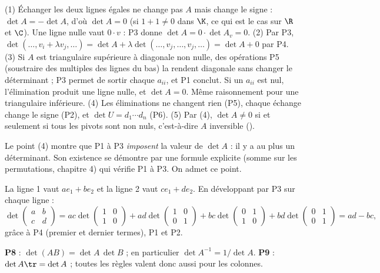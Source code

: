 \begin{preuve}
(1) Échanger les deux lignes égales ne change pas $A$ mais change le signe : $\det A=-\det A$, d'où $\det A=0$ (si $1+1\neq0$ dans $\K$, ce qui est le cas sur $\R$ et $\C$). Une ligne nulle vaut $0\cdot v$ : P3 donne $\det A=0\cdot\det A_v=0$.
(2) Par P3, $\det(\dots,v_i+\lambda v_j,\dots)=\det A+\lambda\det(\dots,v_j,\dots,v_j,\dots)=\det A+0$ par P4.
(3) Si $A$ est triangulaire supérieure à diagonale non nulle, des opérations P5 (soustraire des multiples des lignes du bas) la rendent diagonale sans changer le déterminant ; P3 permet de sortir chaque $a_{ii}$, et P1 conclut. Si un $a_{ii}$ est nul, l'élimination produit une ligne nulle, et $\det A=0$. Même raisonnement pour une triangulaire inférieure.
(4) Les éliminations ne changent rien (P5), chaque échange change le signe (P2), et $\det U=d_1\cdots d_n$ (P6).
(5) Par (4), $\det A\neq0$ si et seulement si tous les pivots sont non nuls, c'est-à-dire $A$ inversible ().
\end{preuve}
\begin{remarque}
Le point (4) montre que P1 à P3 \emph{imposent} la valeur de $\det A$ : il y a au plus un déterminant. Son existence se démontre par une formule explicite (somme sur les permutations, chapitre 4) qui vérifie P1 à P3. On admet ce point.
\end{remarque}
\begin{exemple}
La ligne 1 vaut $ae_1+be_2$ et la ligne 2 vaut $ce_1+de_2$. En développant par P3 sur chaque ligne :
\[\det\begin{pmatrix}a&b\\c&d\end{pmatrix}=ac\det\begin{pmatrix}1&0\\1&0\end{pmatrix}+ad\det\begin{pmatrix}1&0\\0&1\end{pmatrix}+bc\det\begin{pmatrix}0&1\\1&0\end{pmatrix}+bd\det\begin{pmatrix}0&1\\0&1\end{pmatrix}=ad-bc,\]
grâce à P4 (premier et dernier termes), P1 et P2.
\end{exemple}
\begin{theoreme}\label{thm-det-produit}
\textbf{P8} : $\det(AB)=\det A\,\det B$ ; en particulier $\det A^{-1}=1/\det A$. \textbf{P9} : $\det A\tr=\det A$ ; toutes les règles valent donc aussi pour les colonnes.
\end{theoreme}
